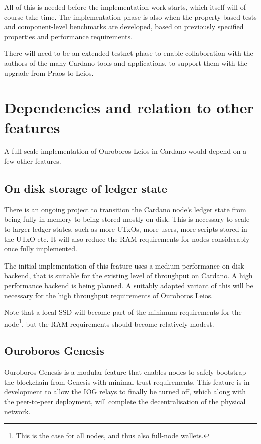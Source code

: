 \documentclass[11pt,a4paper]{article}
\begin{document}
All of this is needed before the implementation work starts, which itself
will of course take time. The implementation phase is also when the
property-based tests and component-level benchmarks are developed, based on
previously specified properties and performance requirements.

There will need to be an extended testnet phase to enable collaboration with
the authors of the many Cardano tools and applications, to support them with
the upgrade from Praos to Leios.

\section{Dependencies and relation to other features}

A full scale implementation of Ouroboros Leios in Cardano would depend on a few
other features.

\subsection{On disk storage of ledger state}
There is an ongoing project to transition the Cardano node's ledger state from
being fully in memory to being stored mostly on disk. This is necessary to
scale to larger ledger states, such as more UTxOs, more users, more scripts
stored in the UTxO etc. It will also reduce the RAM requirements for nodes
considerably once fully implemented.

The initial implementation of this feature uses a medium performance on-disk
backend, that is suitable for the existing level of throughput on Cardano. A
high performance backend is being planned. A suitably adapted variant of this
will be necessary for the high throughput requirements of Ouroboros Leios.

Note that a local SSD will become part of the minimum requirements for the
node\footnote{This is the case for all nodes, and thus also full-node wallets.},
but the RAM requirements should become relatively modest.

\subsection{Ouroboros Genesis}
Ouroboros Genesis is a modular feature that enables nodes to safely bootstrap
the blockchain from Genesis with minimal trust requirements. This feature is in
development to allow the IOG relays to finally be turned off, which along with
the peer-to-peer deployment, will complete the decentralisation of the physical
network.
\end{document}
